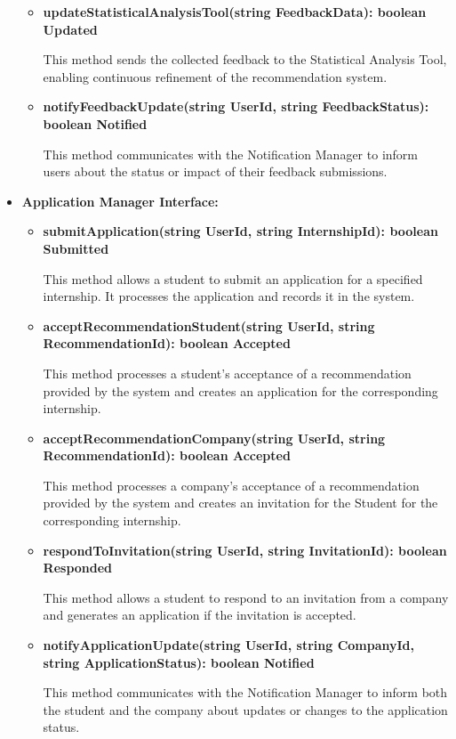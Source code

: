 \begin{itemize}
\begin{itemize}
    \item \textbf{updateStatisticalAnalysisTool(string FeedbackData): boolean Updated}

    This method sends the collected feedback to the Statistical Analysis Tool, enabling continuous refinement of the recommendation system.

    \item \textbf{notifyFeedbackUpdate(string UserId, string FeedbackStatus): boolean Notified}

    This method communicates with the Notification Manager to inform users about the status or impact of their feedback submissions.
    \end{itemize}
    
\item \textbf{Application Manager Interface:}
\begin{itemize}
    \item \textbf{submitApplication(string UserId, string InternshipId): boolean Submitted}

    This method allows a student to submit an application for a specified internship. It processes the application and records it in the system.

    \item \textbf{acceptRecommendationStudent(string UserId, string RecommendationId): boolean Accepted}

    This method processes a student's acceptance of a recommendation provided by the system and creates an application for the corresponding internship.

     \item \textbf{acceptRecommendationCompany(string UserId, string RecommendationId): boolean Accepted}

    This method processes a company's acceptance of a recommendation provided by the system and creates an invitation for the Student for the corresponding internship.

    \item \textbf{respondToInvitation(string UserId, string InvitationId): boolean Responded}

    This method allows a student to respond to an invitation from a company and generates an application if the invitation is accepted.

    \item \textbf{notifyApplicationUpdate(string UserId, string CompanyId, string ApplicationStatus): boolean Notified}

    This method communicates with the Notification Manager to inform both the student and the company about updates or changes to the application status.


\end{itemize}
\end{itemize}
